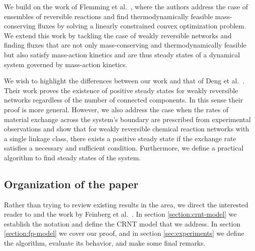 \documentclass[smallextended]{svjour3}       %
\newcounter{sent}
\newcommand*{\0}{\mathbf{0}}
\newcommand*{\1}{\mathbf{1}}
\newcommand*{\R}{\mathbbm{R}}
\begin{document}
We build on the work of Flemming et al.\ \cite{fleming-opt}, where the authors
address the case of ensembles of reversible reactions and find
thermodynamically feasible mass-conserving fluxes by solving a linearly 
constrained convex optimization problem. We extend this work by tackling the case
of weakly reversible networks and finding fluxes that are not only mass-conserving
and thermodynamically feasible but also satisfy mass-action kinetics and 
are thus steady states of a dynamical system governed by mass-action kinetics.

We wish to highlight the differences between our work and that of Deng et al.\ 
\cite{Deng}. Their work proves the existence of positive steady states for 
weakly reversible networks regardless of the number of connected components.
In this sense their proof is more general. However, we
also address the case when the rates of material exchange across the system's 
boundary are prescribed from experimental observations and show that for weakly reversible chemical reaction
networks with a single linkage class, there exists a positive steady state if
the exchange rate satisfies a necessary and sufficient condition. Furthermore, we 
define a practical algorithm to find steady states of the system.

\subsection{Organization of the paper}

Rather than trying to review existing results in the area, we direct the 
interested reader to \cite{gunawardena,GMAK} and the work by Feinberg et al.\ 
\cite{deficiency0,deficiency1}. In section \ref{section:crnt-model} we establish
the notation and define the CRNT model that we address. In section
\ref{section:fp-model} we cover our proof, and in section \ref{sec:experiments}
we define the algorithm, evaluate its behavior, and make some final remarks.

%
%
\end{document}
